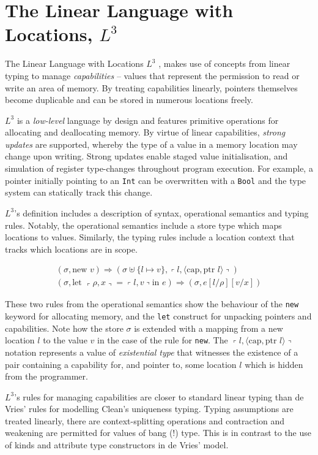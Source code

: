 \documentclass[]{unswthesis}
\newcommand{\lquine}{\left\ulcorner}
\newcommand{\rquine}{\right\urcorner}
\newcommand{\capa}{\text{cap}}
\newcommand{\ptr}{\text{ptr }}
\begin{document}
\section{The Linear Language with Locations, $L^3$}

The Linear Language with Locations $L^3$ \cite{ahmed05}, makes use of concepts from linear typing to manage \textit{capabilities} -- values that represent the permission to read or write an area of memory. By treating capabilities linearly, pointers themselves become duplicable and can be stored in numerous locations freely.

$L^3$ is a \textit{low-level} language by design and features primitive operations for allocating and deallocating memory. By virtue of linear capabilities, \textit{strong updates} are supported, whereby the type of a value in a memory location may change upon writing. Strong updates enable staged value initialisation, and simulation of register type-changes throughout program execution. For example, a pointer initially pointing to an \texttt{Int} can be overwritten with a \texttt{Bool} and the type system can statically track this change.

$L^3$'s definition includes a description of syntax, operational semantics and typing rules. Notably, the operational semantics include a store type which maps locations to values. Similarly, the typing rules include a location context that tracks which locations are in scope.

\begin{eqnarray*}
(\sigma, \text{new } v) \Rightarrow (\sigma \uplus \{l \mapsto v\},
	\lquine l, \langle \capa, \ptr l \rangle \rquine)
\\
(\sigma, \text{let } \lquine \rho, x \rquine = \lquine l, v \rquine \text{in } e)
	\Rightarrow
	(\sigma, e[l/\rho][v/x])
\end{eqnarray*}

These two rules from the operational semantics show the behaviour of the \texttt{new} keyword for allocating memory, and the \texttt{let} construct for unpacking pointers and capabilities. Note how the store $\sigma$ is extended with a mapping from a new location $l$ to the value $v$ in the case of the rule for \texttt{new}. The $\lquine l, \langle \capa, \ptr l \rangle \rquine$ notation represents a value of \textit{existential type} that witnesses the existence of a pair containing a capability for, and pointer to, some location $l$ which is hidden from the programmer.

$L^3$'s rules for managing capabilities are closer to standard linear typing than de Vries' rules for modelling Clean's uniqueness typing. Typing assumptions are treated linearly, there are context-splitting operations and contraction and weakening are permitted for values of bang (!) type. This is in contrast to the use of kinds and attribute type constructors in de Vries' model.
\end{document}
